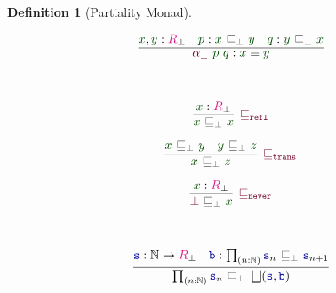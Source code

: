 \documentclass[twoside,11pt,openright]{report}
\theoremstyle{plain} %
\theoremstyle{definition}
\newtheorem{defn}[thm]{Definition}%
\theoremstyle{remark}
\newcommand*{\term}[1]{\textcolor{green!30!black}{#1}} %
\newcommand*{\type}[1]{\textcolor{magenta!90!black}{#1}}
\newcommand*{\relation}[1]{\textcolor{gray!75!black}{\ensuremath{\mathtt{#1}}}}
\newcommand*{\function}[1]{\textcolor{blue!60!black}{\ensuremath{\mathtt{#1}}}}
\newcommand*{\constructor}[1]{\textcolor{purple!60!black}{\ensuremath{\mathtt{#1}}}}
\begin{document}
\begin{defn}[Partiality Monad]
\begin{center}
    \hfill
    \begin{minipage}{0.45\linewidth}
      \begin{equation}
        \vcenter{\infer{\constructor{\alpha_{\bot}}~\term{p}~\term{q} : \term{x} \equiv \term{y}}{\term{x},\term{y} : \type{R}_\bot & \term{p} : \term{x}~\relation{\sqsubseteq_{\bot}}~\term{y} & \term{q} : \term{y}~\relation{\sqsubseteq_{\bot}}~\term{x}}}
      \end{equation}
    \end{minipage}
  \end{center}
  \strut\\[-15mm]
  \begin{center}
    \begin{minipage}{0.25\linewidth}
      \begin{equation}
        \vcenter{\infer[\constructor{\sqsubseteq_{refl}}]{\term{x}~\relation{\sqsubseteq_{\bot}}~\term{x}}{\term{x} : \type{R}_\bot}}
      \end{equation}
    \end{minipage}
    \hfill
    \begin{minipage}{0.35\linewidth}
      \begin{equation}
        \vcenter{\infer[\constructor{\sqsubseteq_{trans}}]{\term{x}~\relation{\sqsubseteq_{\bot}}~\term{z}}{\term{x}~\relation{\sqsubseteq_{\bot}}~\term{y} & \term{y}~\relation{\sqsubseteq_{\bot}}~\term{z}}}
      \end{equation}
    \end{minipage}
    \hfill
    \begin{minipage}{0.25\linewidth}
      \begin{equation}
        \vcenter{\infer[\constructor{\sqsubseteq_{never}}]{\constructor{\bot}~\relation{\sqsubseteq_{\bot}}~\term{x}}{\term{x} : \type{R}_\bot}}
      \end{equation}
    \end{minipage}
  \end{center}
  \strut\\[-15mm]
  \begin{center}
    \hfill
    \begin{minipage}{0.50\linewidth}
      \begin{equation}
        \vcenter{\infer{\prod_{(n : \mathbb{N})} \function{s}_n~\relation{\sqsubseteq_{\bot}}~\bigsqcup(\function{s},\function{b})}{\function{s} : \mathbb{N} \rightarrow \type{R}_\bot & \function{b} : \prod_{(n : \mathbb{N})} \function{s}_n~\relation{\sqsubseteq_{\bot}}~\function{s}_{n+1} }}

\end{equation}
\end{minipage}
\end{center}
\end{defn}
\end{document}
